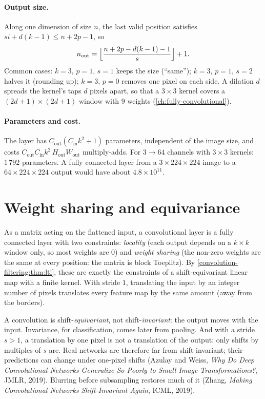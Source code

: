 \begin{notechapter}
\paragraph{Output size.} Along one dimension of size $n$, the last valid position satisfies
$si + d(k - 1)\leq n + 2p - 1$, so
\[
  n_{\mathrm{out}} = \Bigl\lfloor\frac{n + 2p - d(k - 1) - 1}s\Bigr\rfloor + 1 .
\]
Common cases: $k = 3$, $p = 1$, $s = 1$ keeps the size (``same''); $k = 3$, $p = 1$, $s = 2$ halves it (rounding up);
$k = 3$, $p = 0$ removes one pixel on each side. A dilation $d$ spreads the kernel's taps $d$ pixels
apart, so that a $3\times3$ kernel covers a $(2d + 1)\times(2d + 1)$ window with $9$ weights
(\cref{ch:fully-convolutional}).

\paragraph{Parameters and cost.} The layer has $C_{\mathrm{out}}(C_{\mathrm{in}}k^2 + 1)$ parameters, independent of the image size,
and costs $C_{\mathrm{out}}C_{\mathrm{in}}k^2\,H_{\mathrm{out}}W_{\mathrm{out}}$ multiply-adds. For $3\to64$ channels with $3\times3$ kernels: $1\,792$ parameters. A fully
connected layer from a $3\times224\times224$ image to a $64\times224\times224$ output would have about $4.8\times10^{11}$.

\section{Weight sharing and equivariance}\label{convolutional-layers:sec:sharing}

As a matrix acting on the flattened input, a convolutional layer is a fully connected layer
with two constraints: \emph{locality} (each output depends on a $k\times k$ window only, so most weights are
$0$) and \emph{weight sharing} (the non-zero weights are the same at every position: the matrix is
block Toeplitz). By \cref{convolution-filtering:thm:lti}, these are exactly the constraints
of a shift-equivariant linear map with a finite kernel. With stride $1$, translating the input
by an integer number of pixels translates every feature map by the same amount (away from
the borders).

\begin{pitfall}
A convolution is shift-\emph{equivariant}, not shift-\emph{invariant}: the output moves with the input.
Invariance, for classification, comes later from pooling. And with a stride $s>1$, a
translation by one pixel is not a translation of the output: only shifts by multiples of $s$
are. Real networks are therefore far from shift-invariant; their predictions can change
under one-pixel shifts (Azulay and Weiss, \emph{Why Do Deep Convolutional Networks
Generalize So Poorly to Small Image Transformations?}, JMLR, 2019). Blurring before
subsampling restores much of it (Zhang, \emph{Making Convolutional Networks
Shift-Invariant Again}, ICML, 2019).
\end{pitfall}


\end{notechapter}
